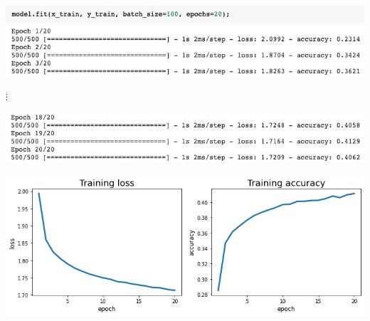 \documentclass{beamer}
\begin{document}
    \begin{frame}
        \includegraphics[width=\textwidth]{training-start.jpg}
        \begin{center}
            $\vdots$
        \end{center}
        \includegraphics[width=\textwidth]{training-end.jpg}
        
        \bigskip
        \includegraphics[width=\textwidth]{loss-accuracy.jpg}
    
    \end{frame}
    
\end{document}
